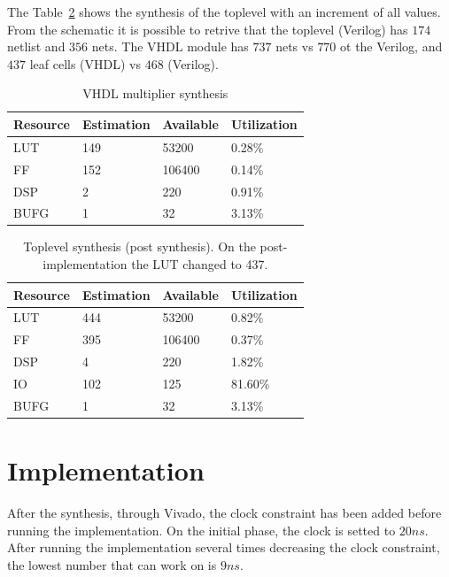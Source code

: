 \documentclass[]{IEEEtran}
\begin{document}
The Table~\ref{tab:tl_sintesi} shows the synthesis of the toplevel with an increment of all values.
From the schematic it is possible to retrive that the toplevel (Verilog) has $174$ netlist and $356$ nets. The VHDL module has $737$ nets vs $770$ ot the Verilog, and $437$ leaf cells (VHDL) vs $468$ (Verilog).
	\begin{table}[]
	\centering
	\begin{tabular}{@{}llll@{}}
		\toprule
		Resource & Estimation & Available & Utilization \\ \midrule
		LUT      & 149        & 53200     & 0.28\%      \\
		FF       & 152        & 106400    & 0.14\%      \\
		DSP      & 2          & 220       & 0.91\%      \\
		BUFG     & 1          & 32        & 3.13\%      \\ \bottomrule
	\end{tabular}
	\caption{VHDL multiplier synthesis}
	\label{tab:vhd_sintesi}
\end{table}

\begin{table}[]
		\centering
\begin{tabular}{@{}llll@{}}
	\toprule
	Resource & Estimation & Available & Utilization \\ \midrule
	LUT      & 444        & 53200     & 0.82\%      \\
	FF       & 395        & 106400    & 0.37\%      \\
	DSP      & 4          & 220       & 1.82\%      \\
	IO       & 102        & 125       & 81.60\%     \\
	BUFG     & 1          & 32        & 3.13\%      \\ \bottomrule
	\end{tabular}
	\caption{Toplevel  synthesis (post synthesis). On the post-implementation the LUT changed to 437.}
\label{tab:tl_sintesi}
\end{table}

	\section{Implementation}
\label{sec:impl}
After the synthesis, through Vivado, the clock constraint has been added before running the implementation. On the initial phase, the clock is setted to $20ns$. After running the implementation several times decreasing the clock constraint, the lowest number that can work on is $9ns$.
\end{document}
